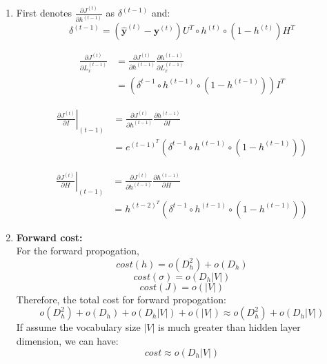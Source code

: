 \documentclass[10pt]{article}
\begin{document}
\begin{enumerate}[label=(\alph*)]
\item
First denotes $\frac{\partial J^{(t)}}{\partial h^{(t-1)}}$ as $\delta^{(t-1)}$ and:
\begin{equation*}
	\delta^{(t-1)} =(\hat{\mathbf{y}}^{(t)} - \mathbf{y}^{(t)})U^{T}\circ h^{(t)}\circ(1-h^{(t)})H^{T}
\end{equation*}

\begin{equation}
\begin{aligned}
	\frac{\partial J^{(t)}}{\partial L_x^{(t-1)}} & = \frac{\partial J^{(t)}}{\partial h^{(t-1)}}
	\frac{\partial h^{(t-1)}}{\partial L_x^{(t-1)}}\\
	& = (\delta^{t-1}\circ h^{(t-1)}\circ(1-h^{(t-1)}))I^{T}
\end{aligned}
\end{equation}

\begin{equation}
\begin{aligned}
	\left.\frac{\partial J^{(t)}}{\partial I}\right|_{(t-1)} & = \frac{\partial J^{(t)}}{\partial h^{(t-1)}}
	\frac{\partial h^{(t-1)}}{\partial I}\\
	& = e^{(t-1)^T}(\delta^{t-1}\circ h^{(t-1)}\circ(1-h^{(t-1)}))
\end{aligned}
\end{equation}

\begin{equation}
\begin{aligned}
	\left.\frac{\partial J^{(t)}}{\partial H}\right|_{(t-1)} & = \frac{\partial J^{(t)}}{\partial h^{(t-1)}}
	\frac{\partial h^{(t-1)}}{\partial H}\\
	& = h^{(t-2)^T}(\delta^{t-1}\circ h^{(t-1)}\circ(1-h^{(t-1)}))
\end{aligned}
\end{equation}

\item
\textbf{Forward cost:}\\
For the forward propogation,
\begin{equation*}
	cost(h) = o(D_h^2) + o(D_h)
\end{equation*}
\begin{equation*}
	cost(\sigma) = o(D_h|V|)
\end{equation*}
\begin{equation*}
	cost(J) = o(|V|)
\end{equation*}
Therefore, the total cost for forward propogation:
\begin{equation*}
	o(D_h^2) + o(D_h) + o(D_h|V|) + o(|V|) \approx o(D_h^2) + o(D_h|V|)
\end{equation*}
If assume the vocabulary size $|V|$ is much greater than hidden layer dimension, we can have:
$$
cost \approx o(D_h|V|)
$$



\end{enumerate}
\end{document}
